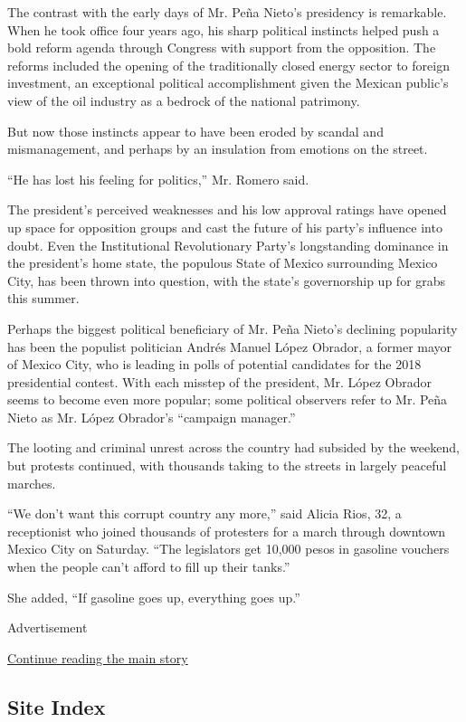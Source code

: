 The contrast with the early days of Mr. Peña Nieto's presidency is
remarkable. When he took office four years ago, his sharp political
instincts helped push a bold reform agenda through Congress with support
from the opposition. The reforms included the opening of the
traditionally closed energy sector to foreign investment, an exceptional
political accomplishment given the Mexican public's view of the oil
industry as a bedrock of the national patrimony.

But now those instincts appear to have been eroded by scandal and
mismanagement, and perhaps by an insulation from emotions on the street.

``He has lost his feeling for politics,'' Mr. Romero said.

The president's perceived weaknesses and his low approval ratings have
opened up space for opposition groups and cast the future of his party's
influence into doubt. Even the Institutional Revolutionary Party's
longstanding dominance in the president's home state, the populous State
of Mexico surrounding Mexico City, has been thrown into question, with
the state's governorship up for grabs this summer.

Perhaps the biggest political beneficiary of Mr. Peña Nieto's declining
popularity has been the populist politician Andrés Manuel López Obrador,
a former mayor of Mexico City, who is leading in polls of potential
candidates for the 2018 presidential contest. With each misstep of the
president, Mr. López Obrador seems to become even more popular; some
political observers refer to Mr. Peña Nieto as Mr. López Obrador's
``campaign manager.''

The looting and criminal unrest across the country had subsided by the
weekend, but protests continued, with thousands taking to the streets in
largely peaceful marches.

``We don't want this corrupt country any more,'' said Alicia Rios, 32, a
receptionist who joined thousands of protesters for a march through
downtown Mexico City on Saturday. ``The legislators get 10,000 pesos in
gasoline vouchers when the people can't afford to fill up their tanks.''

She added, ``If gasoline goes up, everything goes up.''

Advertisement

\protect\hyperlink{after-bottom}{Continue reading the main story}

\hypertarget{site-index}{%
\subsection{Site Index}\label{site-index}}

